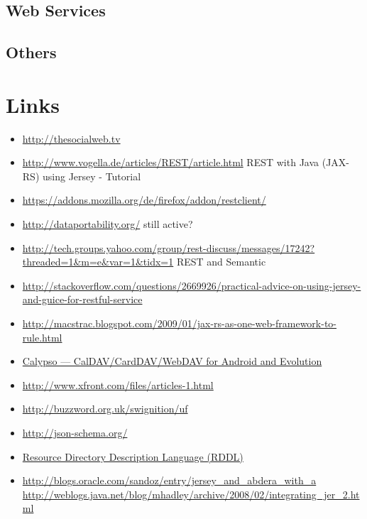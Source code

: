 \documentclass[12pt,a4paper]{scrartcl}		%
\begin{document}
\subsection{Web Services}

\subsection{Others}

\section{Links}

\begin{itemize}
\item \url{http://thesocialweb.tv}
\item \url{http://www.vogella.de/articles/REST/article.html} REST with Java (JAX-RS) using Jersey - Tutorial
\item \url{https://addons.mozilla.org/de/firefox/addon/restclient/}
\item \url{http://dataportability.org/} still active?
\item \url{http://tech.groups.yahoo.com/group/rest-discuss/messages/17242?threaded=1&m=e&var=1&tidx=1} REST and Semantic
\item \url{http://stackoverflow.com/questions/2669926/practical-advice-on-using-jersey-and-guice-for-restful-service}
\item \url{http://macstrac.blogspot.com/2009/01/jax-rs-as-one-web-framework-to-rule.html}
\item \href{http://keithp.com/blogs/calypso/}{Calypso — CalDAV/CardDAV/WebDAV for Android and Evolution}
\item \url{http://www.xfront.com/files/articles-1.html}
\item \url{http://buzzword.org.uk/swignition/uf}
\item \url{http://json-schema.org/}
\item \href{http://www.rddl.org/}{Resource Directory Description Language (RDDL)}
\item \url{http://blogs.oracle.com/sandoz/entry/jersey_and_abdera_with_a}  \url{http://weblogs.java.net/blog/mhadley/archive/2008/02/integrating_jer_2.html}

\end{itemize}
\end{document}
